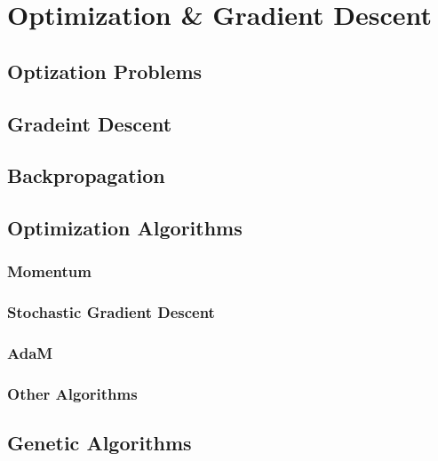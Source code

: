 \setchapterpreamble[u]{\margintoc}
\chapter{Optimization \& Gradient Descent}

\section{Optization Problems}

\section{Gradeint Descent}

\section{Backpropagation}


\section{Optimization Algorithms}
\subsection{Momentum}
\subsection{Stochastic Gradient Descent}
\subsection{AdaM}
\subsection{Other Algorithms}

\section{Genetic Algorithms}
